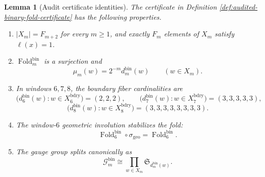 \documentclass[12pt,a4paper]{article}
\theoremstyle{plain}
\newtheorem{lemma}[theorem]{Lemma}
\theoremstyle{definition}
\numberwithin{equation}{section}
\newcommand{\Fold}{\operatorname{Fold}}
\begin{document}
\begin{lemma}[Audit certificate identities]\label{lem:audited-binary-fold-certificate-identities}
The certificate in Definition \ref{def:audited-binary-fold-certificate} has the following properties.
\begin{enumerate}[label=\textup{(\roman*)}]
\item \(|X_m|=F_{m+2}\) for every \(m\ge1\), and exactly \(F_m\) elements of \(X_m\) satisfy \(\ell(x)=1\).
\item \(\Fold_m^{\mathrm{bin}}\) is a surjection and
\[
\mu_m(w)=2^{-m}d_m^{\mathrm{bin}}(w)
\qquad(w\in X_m).
\]
\item In windows \(6,7,8\), the boundary fiber cardinalities are
\[
\bigl(d_6^{\mathrm{bin}}(w):w\in X_6^{\mathrm{bdry}}\bigr)=(2,2,2),
\qquad
\bigl(d_7^{\mathrm{bin}}(w):w\in X_7^{\mathrm{bdry}}\bigr)=(3,3,3,3,3),
\]
\[
\bigl(d_8^{\mathrm{bin}}(w):w\in X_8^{\mathrm{bdry}}\bigr)=(3,3,3,3,3,3,3,3).
\]
\item The window-\(6\) geometric involution stabilizes the fold:
\[
\Fold_6^{\mathrm{bin}}\circ\sigma_{\mathrm{geo}}=\Fold_6^{\mathrm{bin}}.
\]
\item The gauge group splits canonically as
\[
\mathcal G_m^{\mathrm{bin}}\cong \prod_{w\in X_m}\mathfrak S_{d_m^{\mathrm{bin}}(w)}.
\]
\end{enumerate}
\end{lemma}
\end{document}
